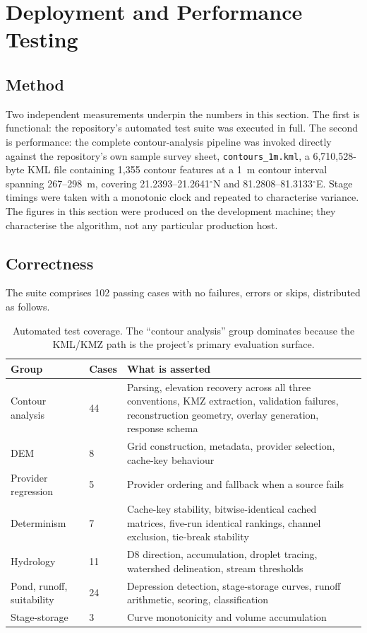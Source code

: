 \documentclass[sigconf,review,10pt]{acmart}
\begin{document}
\section{Deployment and Performance Testing}
\label{sec:perf}

\subsection{Method}

Two independent measurements underpin the numbers in this section. The
first is functional: the repository's automated test suite was executed in
full. The second is performance: the complete contour-analysis pipeline was
invoked directly against the repository's own sample survey sheet,
\texttt{contours\_1m.kml}, a 6,710,528-byte KML file containing 1,355
contour features at a 1~m contour interval spanning 267--298~m, covering
21.2393--21.2641$^\circ$N and 81.2808--81.3133$^\circ$E. Stage timings
were taken with a monotonic clock and repeated to characterise variance.
The figures in this section were produced on the development machine; they
characterise the algorithm, not any particular production host.

\subsection{Correctness}

The suite comprises 102 passing cases with no failures, errors or skips,
distributed as follows.

\begin{table}[t]
\caption{Automated test coverage. The ``contour analysis'' group dominates
because the KML/KMZ path is the project's primary evaluation surface.}
\label{tab:tests}
\small
\begin{tabular}{@{}R{1.95cm}R{0.8cm}R{4.75cm}@{}}
\toprule
\textbf{Group} & \textbf{Cases} & \textbf{What is asserted} \\
\midrule
Contour analysis & 44 & Parsing, elevation recovery across all three conventions, KMZ extraction, validation failures, reconstruction geometry, overlay generation, response schema \\
DEM & 8 & Grid construction, metadata, provider selection, cache-key behaviour \\
Provider regression & 5 & Provider ordering and fallback when a source fails \\
Determinism & 7 & Cache-key stability, bitwise-identical cached matrices, five-run identical rankings, channel exclusion, tie-break stability \\
Hydrology & 11 & D8 direction, accumulation, droplet tracing, watershed delineation, stream thresholds \\
Pond, runoff, suitability & 24 & Depression detection, stage-storage curves, runoff arithmetic, scoring, classification \\
Stage-storage & 3 & Curve monotonicity and volume accumulation \\
\bottomrule
\end{tabular}
\end{table}
\end{document}
